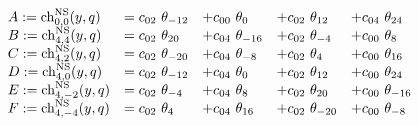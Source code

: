 \begin{equation}
  \begin{array}{lllll}
A := {\rm ch}_{0,0}^{\rm NS}(y,q) &= c_{02}~\theta_{-12} &+
c_{00}~\theta_{0} &+ c_{02}~\theta_{12} &+ c_{04}~\theta_{24}\\ 
B := {\rm ch}_{4,4}^{\rm NS}(y,q) &= c_{02}~\theta_{20} &+
c_{04}~\theta_{-16} &+ c_{02}~\theta_{-4} &+ c_{00}~\theta_{8}\\ 
C := {\rm ch}_{4,2}^{\rm NS}(y,q) &= c_{02}~\theta_{-20} &+
c_{04}~\theta_{-8} &+ c_{02}~\theta_{4} &+ c_{00}~\theta_{16}\\ 
D := {\rm ch}_{4,0}^{\rm NS}(y,q) &= c_{02}~\theta_{-12} &+
c_{04}~\theta_{0} &+ c_{02}~\theta_{12} &+ c_{00}~\theta_{24}\\ 
E := {\rm ch}_{4,-2}^{\rm NS}(y,q) &= c_{02}~\theta_{-4} &+
c_{04}~\theta_{8} &+ c_{02}~\theta_{20} &+ c_{00}~\theta_{-16} \\
F := {\rm ch}_{4,-4}^{\rm NS}(y,q) &= c_{02}~\theta_{4} &+
c_{04}~\theta_{16} &+ c_{02}~\theta_{-20} &+ c_{00}~\theta_{-8}\\
  \end{array}
\end{equation}

